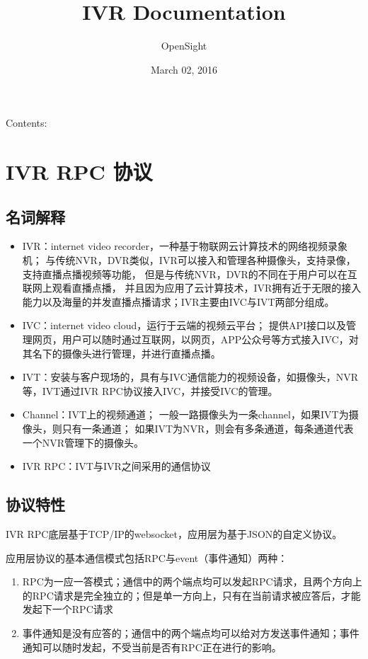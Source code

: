 \documentclass[letterpaper,10pt,english]{sphinxmanual}
\title{IVR Documentation}
\date{March 02, 2016}
\author{OpenSight}
\begin{document}
\maketitle
\tableofcontents
{}\label{index::doc}


Contents:


\chapter{IVR RPC 协议}
\label{rpc:ivr-rpc}\label{rpc::doc}\label{rpc:ivr}

\section{名词解释}
\label{rpc:id1}\begin{itemize}
\item {} 
IVR：internet video recorder，一种基于物联网云计算技术的网络视频录象机；
与传统NVR，DVR类似，IVR可以接入和管理各种摄像头，支持录像，支持直播点播视频等功能，
但是与传统NVR，DVR的不同在于用户可以在互联网上观看直播点播，
并且因为应用了云计算技术，IVR拥有近于无限的接入能力以及海量的并发直播点播请求；IVR主要由IVC与IVT两部分组成。

\item {} 
IVC：internet video cloud，运行于云端的视频云平台；
提供API接口以及管理网页，用户可以随时通过互联网，以网页，APP公众号等方式接入IVC，对其名下的摄像头进行管理，并进行直播点播。

\item {} 
IVT：安装与客户现场的，具有与IVC通信能力的视频设备，如摄像头，NVR等，IVT通过IVR RPC协议接入IVC，并接受IVC的管理。

\item {} 
Channel：IVT上的视频通道；
一般一路摄像头为一条channel，如果IVT为摄像头，则只有一条通道；
如果IVT为NVR，则会有多条通道，每条通道代表一个NVR管理下的摄像头。

\item {} 
IVR RPC：IVT与IVR之间采用的通信协议

\end{itemize}


\section{协议特性}
\label{rpc:id2}
IVR RPC底层基于TCP/IP的websocket，应用层为基于JSON的自定义协议。

应用层协议的基本通信模式包括RPC与event（事件通知）两种：
\begin{enumerate}
\item {} 
RPC为一应一答模式；通信中的两个端点均可以发起RPC请求，且两个方向上的RPC请求是完全独立的；但是单一方向上，只有在当前请求被应答后，才能发起下一个RPC请求

\item {} 
事件通知是没有应答的；通信中的两个端点均可以给对方发送事件通知；事件通知可以随时发起，不受当前是否有RPC正在进行的影响。

\end{enumerate}
\end{document}
